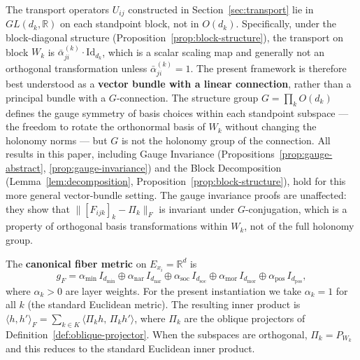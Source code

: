 \begin{remark}
\label{rem:vector-bundle}
The transport operators $U_{ij}$ constructed in Section~\ref{sec:transport} lie in
$GL(d_k, \mathbb{R})$ on each standpoint block, not in $O(d_k)$. Specifically, under the
block-diagonal structure (Proposition~\ref{prop:block-structure}), the transport on block
$W_k$ is $\bar{\alpha}^{(k)}_{ji} \cdot \mathrm{Id}_{d_k}$, which is a scalar scaling map
and generally not an orthogonal transformation unless $\bar{\alpha}^{(k)}_{ji} = 1$. The
present framework is therefore best understood as a \textbf{vector bundle with a linear
connection}, rather than a principal bundle with a $G$-connection. The structure group
$G = \prod_k O(d_k)$ defines the gauge symmetry of basis choices within each standpoint
subspace --- the freedom to rotate the orthonormal basis of $W_k$ without changing the
holonomy norms --- but $G$ is not the holonomy group of the connection. All results in
this paper, including Gauge Invariance (Propositions~\ref{prop:gauge-abstract},
\ref{prop:gauge-invariance}) and the Block Decomposition (Lemma~\ref{lem:decomposition},
Proposition~\ref{prop:block-structure}), hold for this more general vector-bundle setting.
The gauge invariance proofs are unaffected: they show that $\|[F_{ijk}]_k - \Pi_k\|_F$ is
invariant under $G$-conjugation, which is a property of orthogonal basis transformations
within $W_k$, not of the full holonomy group.
\end{remark}

\begin{definition}
\label{def:fiber-metric}
The \textbf{canonical fiber metric} on $E_{x_i} = \mathbb{R}^d$ is
\[
    g_F = \alpha_{\mathrm{min}}\, I_{d_{\mathrm{min}}} \oplus
    \alpha_{\mathrm{nar}}\, I_{d_{\mathrm{nar}}} \oplus
    \alpha_{\mathrm{soc}}\, I_{d_{\mathrm{soc}}} \oplus
    \alpha_{\mathrm{mor}}\, I_{d_{\mathrm{mor}}} \oplus
    \alpha_{\mathrm{pos}}\, I_{d_{\mathrm{pos}}},
\]
where $\alpha_k > 0$ are layer weights. For the present instantiation we take $\alpha_k
= 1$ for all $k$ (the standard Euclidean metric). The resulting inner product is
$\langle h, h' \rangle_F = \sum_{k \in K} \langle \Pi_k h,\, \Pi_k h' \rangle$, where
$\Pi_k$ are the oblique projectors of Definition~\ref{def:oblique-projector}. When the
subspaces are orthogonal, $\Pi_k = P_{W_k}$ and this reduces to the standard Euclidean
inner product.
\end{definition}

